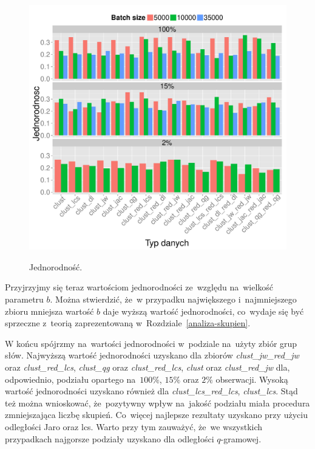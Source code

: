 \documentclass{praca1}
\begin{document}
\begin{figure}[!h]
  \centering
  \includegraphics[width=420pt]{plot10.pdf}\\
  \caption{Jednorodność.}\label{plot:005}
\end{figure}

Przyjrzyjmy się teraz wartościom jednorodności ze~względu na~wielkość parametru $b$. Można stwierdzić, że~w przypadku największego i~najmniejszego zbioru mniejsza wartość $b$ daje wyższą wartość jednorodności, co~wydaje się być sprzeczne z~teorią zaprezentowaną w~Rozdziale~\ref{analiza-skupien}.

W końcu spójrzmy na~wartości jednorodności w~podziale na~użyty zbiór grup słów. Najwyższą wartość jednorodności uzyskano dla zbiorów \emph{clust\_jw\_red\_jw} oraz \emph{clust\_red\_lcs}, \emph{clust\_qg} oraz \emph{clust\_red\_lcs}, \emph{clust} oraz \emph{clust\_red\_jw} dla, odpowiednio, podziału opartego na~$100\%$, $15\%$ oraz $2\%$ obserwacji. Wysoką wartość jednorodności uzyskano również dla \emph{clust\_lcs\_red\_lcs}, \emph{clust\_lcs}. Stąd też można wnioskować, że~pozytywny wpływ na~jakość podziału miała procedura zmniejszająca liczbę skupień. Co~więcej najlepsze rezultaty uzyskano przy użyciu odległości Jaro oraz lcs. Warto przy tym zauważyć, że~we wszystkich przypadkach najgorsze podziały uzyskano dla odległości $q$-gramowej.
\end{document}
